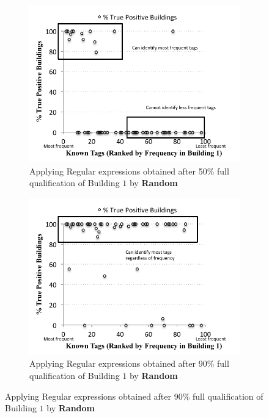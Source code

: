 \begin{figure}[ht!]
\begin{subfigure}{0.4\textwidth}
		\label{fig:point90}
	\end{subfigure}
	\begin{subfigure}{0.4\textwidth}
                \centering
		\includegraphics[width=\textwidth]{./figs/recallCampusWide-build-50.pdf}
                \caption{Applying Regular expressions obtained after 50\% full qualification of Building $1$ by {\bf Random}}
		\label{fig:build50}
	\end{subfigure}
	\begin{subfigure}{0.4\textwidth}
                \centering
		\includegraphics[width=\textwidth]{./figs/recallCampusWide-build-90.pdf}
                \caption{Applying Regular expressions obtained after 90\% full qualification of Building $1$ by {\bf Random}}
		\label{fig:build90}
	\end{subfigure}



\end{figure}
